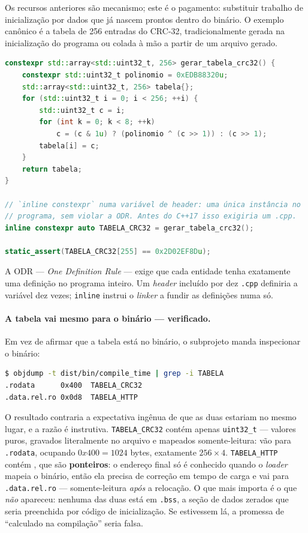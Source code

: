 Os recursos anteriores são mecanismo; este é o pagamento: substituir trabalho de
inicialização por dados que já nascem prontos dentro do binário. O exemplo
canônico é a tabela de 256 entradas do CRC-32, tradicionalmente gerada na
inicialização do programa ou colada à mão a partir de um arquivo gerado.

\begin{lstlisting}[style=bt, language=C++,
    caption={A tabela do CRC-32 calculada pelo compilador, em
             \texttt{src/compile\_time/demo\_tabelas.hpp}.}]
constexpr std::array<std::uint32_t, 256> gerar_tabela_crc32() {
    constexpr std::uint32_t polinomio = 0xEDB88320u;
    std::array<std::uint32_t, 256> tabela{};
    for (std::uint32_t i = 0; i < 256; ++i) {
        std::uint32_t c = i;
        for (int k = 0; k < 8; ++k)
            c = (c & 1u) ? (polinomio ^ (c >> 1)) : (c >> 1);
        tabela[i] = c;
    }
    return tabela;
}

// `inline constexpr` numa variável de header: uma única instância no
// programa, sem violar a ODR. Antes do C++17 isso exigiria um .cpp.
inline constexpr auto TABELA_CRC32 = gerar_tabela_crc32();

static_assert(TABELA_CRC32[255] == 0x2D02EF8Du);
\end{lstlisting}

A ODR --- \emph{One Definition Rule} --- exige que cada entidade tenha
exatamente uma definição no programa inteiro. Um \emph{header} incluído por dez
\texttt{.cpp} definiria a variável dez vezes; \texttt{inline} instrui o
\emph{linker} a fundir as definições numa só.

\paragraph{A tabela vai mesmo para o binário --- verificado.} Em vez de afirmar
que a tabela está no binário, o subprojeto manda inspecionar o binário:

\begin{lstlisting}[style=bt, language=bash,
    caption={Medição em \texttt{src/compile\_time/}: onde as tabelas foram parar
             no executável.}]
$ objdump -t dist/bin/compile_time | grep -i TABELA
.rodata      0x400  TABELA_CRC32
.data.rel.ro 0x0d8  TABELA_HTTP
\end{lstlisting}

O resultado contraria a expectativa ingênua de que as duas estariam no mesmo
lugar, e a razão é instrutiva. \texttt{TABELA\_CRC32} contém apenas
\texttt{uint32\_t} --- valores puros, gravados literalmente no arquivo e
mapeados somente-leitura: vão para \texttt{.rodata}, ocupando
$0x400 = 1024$ bytes, exatamente $256 \times 4$. \texttt{TABELA\_HTTP} contém
, que são \textbf{ponteiros}: o endereço final só é
conhecido quando o \emph{loader} mapeia o binário, então ela precisa de correção
em tempo de carga e vai para \texttt{.data.rel.ro} --- somente-leitura
\emph{após} a relocação. O que mais importa é o que \emph{não} apareceu: nenhuma
das duas está em \texttt{.bss}, a seção de dados zerados que seria preenchida
por código de inicialização. Se estivessem lá, a promessa de ``calculado na
compilação'' seria falsa.

